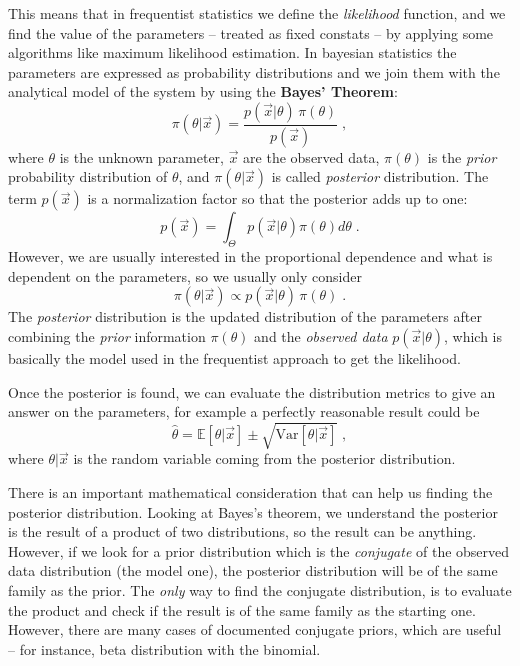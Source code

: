 \documentclass[12pt,a4paper]{article}
\begin{document}
This means that in frequentist statistics we define the \textit{likelihood} function, and we find the value of the parameters -- treated as fixed constats -- by applying some algorithms like maximum likelihood estimation.
In bayesian statistics the parameters are expressed as probability distributions and we join them with the analytical model of the system by using the \textbf{Bayes' Theorem}:
\begin{equation*}
	\pi(\theta | \vec{x}) = \dfrac{p(\vec{x} | \theta)\, \pi(\theta)}{p(\vec{x})} \;,
\end{equation*}
where $\theta$ is the unknown parameter, $\vec{x}$ are the observed data, $\pi(\theta)$ is the \textit{prior} probability distribution of $\theta$, and $\pi(\theta | \vec{x})$ is called \textit{posterior} distribution.
The term $p(\vec{x})$ is a normalization factor so that the posterior adds up to one:
\begin{equation*}
	p(\vec{x}) = \int_{\Theta} p(\vec{x} | \theta) \pi(\theta) d\theta \;.
\end{equation*}
However, we are usually interested in the proportional dependence and what is dependent on the parameters, so we usually only consider
\begin{equation*}
	\pi(\theta | \vec{x}) \propto p(\vec{x} | \theta)\, \pi(\theta) \;.
\end{equation*}
The \textit{posterior} distribution is the updated distribution of the parameters after combining the \textit{prior} information $\pi(\theta)$ and the \textit{observed data} $p(\vec{x} | \theta)$, which is basically the model used in the frequentist approach to get the likelihood.

Once the posterior is found, we can evaluate the distribution metrics to give an answer on the parameters, for example a perfectly reasonable result could be
$$\hat{\theta} = \mathbb{E}[\theta | \vec{x}] \pm \sqrt{\text{Var}[\theta | \vec{x}]} \;,$$
where $\theta | \vec{x}$ is the random variable coming from the posterior distribution.

There is an important mathematical consideration that can help us finding the posterior distribution. Looking at Bayes's theorem, we understand the posterior is the result of a product of two distributions, so the result can be anything. However, if we look for a prior distribution which is the \textit{conjugate} of the observed data distribution (the model one), the posterior distribution will be of the same family as the prior.
The \textit{only} way to find the conjugate distribution, is to evaluate the product and check if the result is of the same family as the starting one. However, there are many cases of documented conjugate priors, which are useful -- for instance, beta distribution with the binomial.
\end{document}
